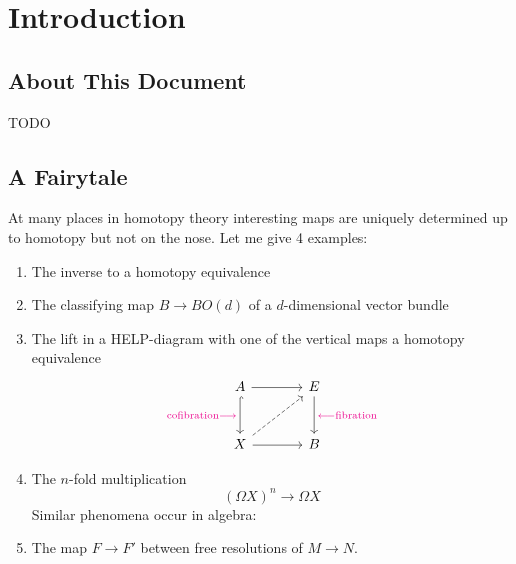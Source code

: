 \chapter*{Introduction}
    \section*{About This Document}
    {\color{magenta}TODO}    

    \section*{A Fairytale}
    At many places in homotopy theory interesting maps are uniquely determined up to homotopy but not on the nose. Let me give 4 examples:

    \begin{enumerate}[label=\arabic*)]
        \item 
            The inverse to a homotopy equivalence \label{list01-01}
        \item 
            The classifying map $B \to BO(d)$ of a $ d$-dimensional vector bundle \label{list01-02}
        \item 
            The lift in a HELP-diagram with one of the vertical maps a homotopy equivalence \label{list01-03}
            \begin{equation*}
                \begin{tikzcd}[row sep=scriptsize, column sep=scriptsize]
                    A && E \\
                    \\
                    X && B
                    \arrow[from=1-1, to=1-3]
                    \arrow["{\color{magenta}{\text{cofibration} \longrightarrow}}"', hook, from=1-1, to=3-1]
                    \arrow["{\color{magenta}{\longleftarrow \text{fibration}}}", from=1-3, to=3-3]
                    \arrow[dashed, from=3-1, to=1-3]
                    \arrow[from=3-1, to=3-3]
                \end{tikzcd}
            \end{equation*} 
        \item 
            The $n$-fold multiplication
            \begin{equation*}
                \left( \Omega X \right)^n \to \Omega X
            \end{equation*}\label{list01-04}
        Similar phenomena occur in algebra:
        \item 
            The map $F \to F'$ between free resolutions of $M \to N$. \label{list01-05}
    \end{enumerate}

